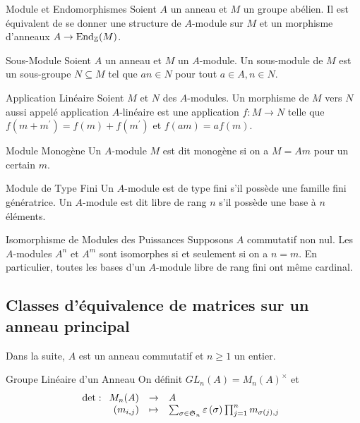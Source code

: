 \documentclass{cours}
\begin{document}
\begin{propositionfr}{Module et Endomorphismes}{}
    Soient $A$ un anneau et $M$ un groupe abélien. Il est équivalent de se donner une structure de $A$-module sur $M$ et un morphisme d'anneaux $A \rightarrow \text{End}_{\mathbb{Z}}(M)$.
\end{propositionfr}

\begin{définition}{Sous-Module}{}
    Soient $A$ un anneau et $M$ un $A$-module. Un sous-module de $M$ est un sous-groupe $N \subseteq M$ tel que $an \in N$ pour tout $a \in A, n \in N$.
\end{définition}
\begin{définition}{Application Linéaire}{}
    Soient $M$ et $N$ des $A$-modules. Un morphisme de $M$ vers $N$ aussi appelé application $A$-linéaire est une application $f : M \to N$ telle que $f(m + m^{'}) = f(m) + f(m^{'})$ et $f(am) = af(m)$.
\end{définition}

\begin{définition}{Module Monogène}{}
    Un $A$-module $M$ est dit monogène si on a $M = Am$ pour un certain $m$.
\end{définition}

\begin{définition}{Module de Type Fini}{}
    Un $A$-module est de type fini s'il possède une famille fini génératrice. Un $A$-module est dit libre de rang $n$ s'il possède une base à $n$ éléments.
\end{définition}

\begin{théorème}{Isomorphisme de Modules des Puissances}{}
    Supposons $A$ commutatif non nul. Les $A$-modules $A^{n}$ et $A^{m}$ sont isomorphes si et seulement si on a $n = m$. En particulier, toutes les bases d'un $A$-module libre de rang fini ont même cardinal.
\end{théorème}


\subsection{Classes d'équivalence de matrices sur un anneau principal}
Dans la suite, $A$ est un anneau commutatif et $n \geq 1$ un entier.

\begin{définition}{Groupe Linéaire d'un Anneau}{}
    On définit $GL_{n}(A) = M_{n}(A)^{\times}$ et
    \[
        \det : \begin{array}[t]{rcl} M_{n}(A) & \to & A \\ \left(m_{i,j}\right) & \mapsto & \sum_{\sigma \in \mathfrak{S}_{n}}\varepsilon\left(\sigma\right)\prod_{j = 1}^{n}m_{\sigma(j), j} \end{array}
    \]
\end{définition}
\end{document}
